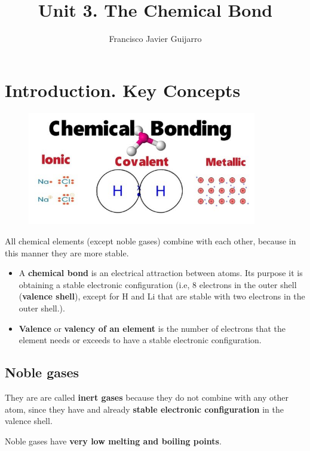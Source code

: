 \documentclass{article}
\title{Unit 3. The Chemical Bond}
\author{Francisco Javier Guijarro}
\begin{document}
	\maketitle

	\section{Introduction. Key Concepts}

		\begin{figure}[htp]
			\centering
			\includegraphics[width=10cm]{chemical_bond_1}
		\end{figure}
	
	
		All chemical elements (except noble gases) combine with each other, 
		because in this manner they are more stable.
		
		\begin{itemize}
				\item A \textbf{chemical bond} is an electrical attraction between atoms. 
				Its purpose it is obtaining a  stable electronic configuration (i.e,  8 electrons in the outer shell (\textbf{valence shell}), except for H and Li that are stable with two electrons in the outer shell.).
				\item \textbf{Valence} or \textbf{valency of an element} is the number of electrons 
				that the element needs or exceeds to have a stable electronic configuration.

		\end{itemize}	
		
		\subsection*{Noble gases}

			They are are called \textbf{inert gases} because they do not combine with any other atom, 
			since they have and already \textbf{stable electronic configuration} in the valence shell.

			Noble gases have \textbf{very low melting and boiling points}.
\end{document}
